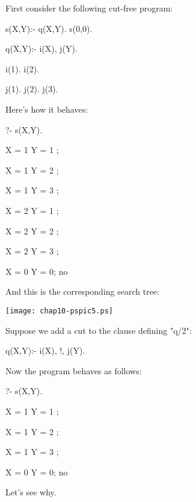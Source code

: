 First consider the following cut-free program:
\begin{LPNcodedisplay}
s(X,Y):- q(X,Y).
s(0,0).

q(X,Y):- i(X), j(Y).

i(1).
i(2).

j(1).
j(2).
j(3).
\end{LPNcodedisplay}

Here's how it behaves:
\begin{LPNcodedisplay}
?- s(X,Y).

X = 1
Y = 1 ;

X = 1
Y = 2 ;

X = 1
Y = 3 ;

X = 2
Y = 1 ;

X = 2
Y = 2 ;

X = 2
Y = 3 ;

X = 0
Y = 0;
no
\end{LPNcodedisplay}


And this is the corresponding search tree:


\begin{center}
\texttt{[image: chap10-pspic5.ps]}
\end{center}





Suppose we add a cut to the clause defining "q/2":
\begin{LPNcodedisplay}
q(X,Y):- i(X), !, j(Y).
\end{LPNcodedisplay}

Now the program behaves as follows:
\begin{LPNcodedisplay}
?- s(X,Y).

X = 1
Y = 1 ;

X = 1
Y = 2 ;

X = 1
Y = 3 ;

X = 0
Y = 0;
no
\end{LPNcodedisplay}

Let's see why.

